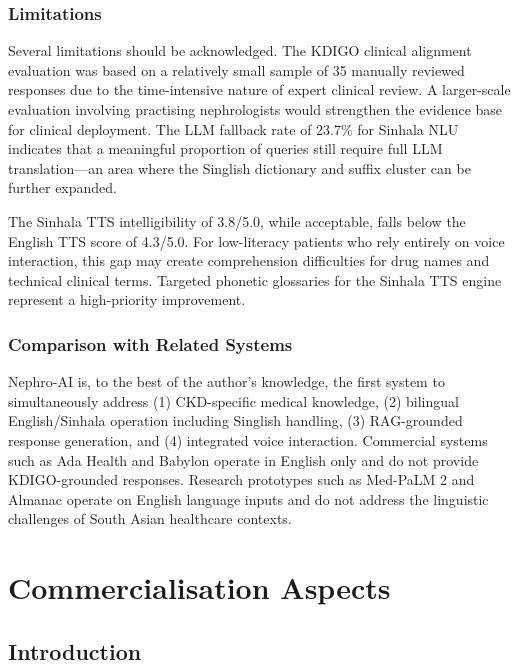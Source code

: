 \documentclass[12pt,a4paper]{report}
\begin{document}
\subsection{Limitations}

Several limitations should be acknowledged. The KDIGO clinical alignment evaluation was based on a relatively small sample of 35 manually reviewed responses due to the time-intensive nature of expert clinical review. A larger-scale evaluation involving practising nephrologists would strengthen the evidence base for clinical deployment. The LLM fallback rate of 23.7\% for Sinhala NLU indicates that a meaningful proportion of queries still require full LLM translation---an area where the Singlish dictionary and suffix cluster can be further expanded.

The Sinhala TTS intelligibility of 3.8/5.0, while acceptable, falls below the English TTS score of 4.3/5.0. For low-literacy patients who rely entirely on voice interaction, this gap may create comprehension difficulties for drug names and technical clinical terms. Targeted phonetic glossaries for the Sinhala TTS engine represent a high-priority improvement.

\subsection{Comparison with Related Systems}

Nephro-AI is, to the best of the author's knowledge, the first system to simultaneously address (1) CKD-specific medical knowledge, (2) bilingual English/Sinhala operation including Singlish handling, (3) RAG-grounded response generation, and (4) integrated voice interaction. Commercial systems such as Ada Health and Babylon operate in English only and do not provide KDIGO-grounded responses. Research prototypes such as Med-PaLM 2 and Almanac operate on English language inputs and do not address the linguistic challenges of South Asian healthcare contexts.

\chapter{Commercialisation Aspects}
\label{chap:commercial}

\section{Introduction}
\end{document}
